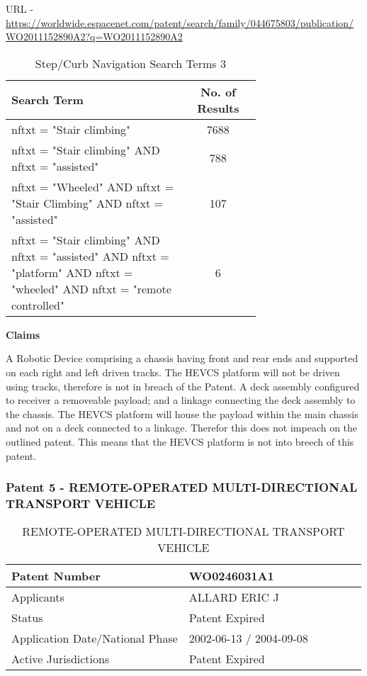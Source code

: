 \documentclass [12pt]{article}
\begin{document}
URL - \url{https://worldwide.espacenet.com/patent/search/family/044675803/publication/WO2011152890A2?q=WO2011152890A2}

\begin{table}[H]
    \centering
    \setlength{\arrayrulewidth}{1.5pt}
    \begin{tabular}{|p{0.7\linewidth}|c|}
    \hline
    \cellcolor{gray!40}Search Term & \cellcolor{gray!40}No. of Results \\
    \hline
    nftxt = "Stair climbing" & 7688 \\
    \hline
    nftxt = "Stair climbing" AND nftxt = "assisted" & 788 \\
    \hline
    nftxt = "Wheeled" AND nftxt = "Stair Climbing" AND nftxt = "assisted" & 107 \\
    \hline
    nftxt = "Stair climbing" AND nftxt = "assisted" AND nftxt = "platform" AND nftxt = "wheeled" AND nftxt = "remote controlled"& 6 \\
    \hline
    \end{tabular}
    \caption{Step/Curb Navigation Search Terms 3}
    \label{table:step_curb_nav_st_3}
\end{table}

\textbf{Claims}

A Robotic Device comprising a chassis having front and rear ends and supported on each right and left driven tracks.
The HEVCS platform will not be driven using tracks, therefore is not in breach of the Patent.
A deck assembly configured to receiver a removeable payload; and a linkage connecting the deck assembly to the chassis.
The HEVCS platform will house the payload within the main chassis and not on a deck connected to a linkage. Therefor this does not impeach on the outlined patent.
This means that the HEVCS platform is not into breech of this patent.

\subsubsection{Patent 5 - REMOTE-OPERATED MULTI-DIRECTIONAL TRANSPORT VEHICLE}

\begin{table}[H]
    \centering
    \setlength{\arrayrulewidth}{1.5pt}
    \begin{tabular}{|p{0.5\linewidth}|p{0.5\linewidth}|}
    \hline
    Patent Number & WO0246031A1\\
    \hline
    Applicants & ALLARD ERIC J\\
    \hline
    Status & Patent Expired\\
    \hline
    Application Date/National Phase & 2002-06-13 / 2004-09-08\\
    \hline
    Active Jurisdictions & Patent Expired\\
    \hline
    \end{tabular}
    \caption{REMOTE-OPERATED MULTI-DIRECTIONAL TRANSPORT VEHICLE}
    \label{table:remote_operated_multi_directional_transport_vehicle_patent_information}
\end{table}
\end{document}
